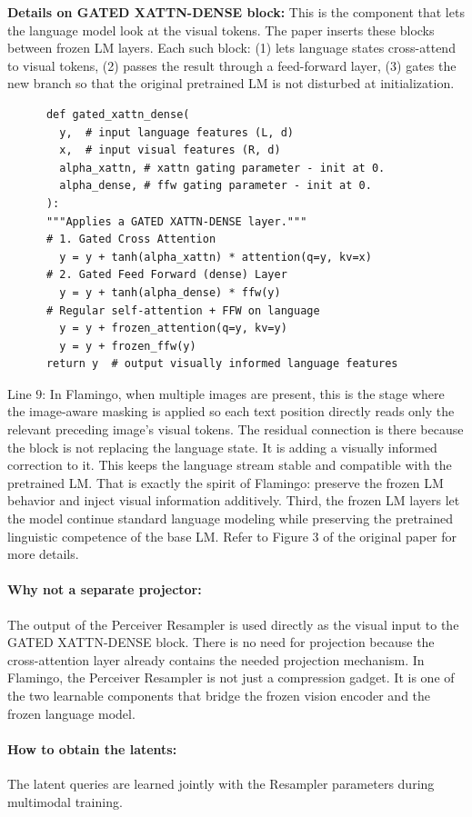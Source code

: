 \documentclass[11pt]{article}  %
\begin{document}
\begin{itemize}
\begin{enumerate}
    \textbf{Details on GATED XATTN-DENSE block:}
    This is the component that lets the language model look at the visual tokens.
    The paper inserts these blocks between frozen LM layers. Each such block: (1) lets language states cross-attend to visual tokens, (2) passes the result through a feed-forward layer, (3) gates the new branch so that the original pretrained LM is not disturbed at initialization.
    \begin{lstlisting}
      def gated_xattn_dense(
        y,  # input language features (L, d)
        x,  # input visual features (R, d)
        alpha_xattn, # xattn gating parameter - init at 0.
        alpha_dense, # ffw gating parameter - init at 0.
      ):
      """Applies a GATED XATTN-DENSE layer."""
      # 1. Gated Cross Attention
        y = y + tanh(alpha_xattn) * attention(q=y, kv=x)
      # 2. Gated Feed Forward (dense) Layer
        y = y + tanh(alpha_dense) * ffw(y)
      # Regular self-attention + FFW on language
        y = y + frozen_attention(q=y, kv=y)
        y = y + frozen_ffw(y)
      return y  # output visually informed language features
    \end{lstlisting}
    Line $9$: In Flamingo, when multiple images are present, this is the stage where the image-aware masking is applied so each text position directly reads only the relevant preceding image's visual tokens.
    The residual connection is there because the block is not replacing the language state. It is adding a visually informed correction to it.
    This keeps the language stream stable and compatible with the pretrained LM. That is exactly the spirit of Flamingo: preserve the frozen LM behavior and inject visual information additively.
    Third, the frozen LM layers let the model continue standard language modeling while preserving the pretrained linguistic competence of the base LM.
    Refer to Figure 3 of the original paper for more details.

    \paragraph{Why not a separate projector:} The output of the Perceiver Resampler is used directly as the visual input to the GATED XATTN-DENSE block. There is no need for projection because the cross-attention layer already contains the needed projection mechanism. In Flamingo, the Perceiver Resampler is not just a compression gadget. It is one of the two learnable components that bridge the frozen vision encoder and the frozen language model.

    \paragraph{How to obtain the latents:} The latent queries are learned jointly with the Resampler parameters during multimodal training.
  \end{enumerate}
\end{itemize}
\end{document}
